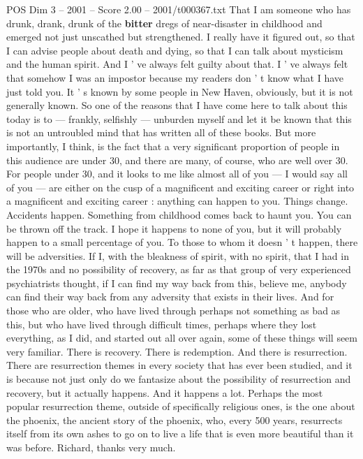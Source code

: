 \begin{textsample}{POS Dim 3 – 2001 – Score 2.00 – 2001/t000367.txt}
That I am someone who has drunk, drank, drunk of the \textbf{bitter} dregs of near-disaster in childhood and emerged not just unscathed but strengthened.
I really have it figured out, so that I can advise people about death and dying, so that I can talk about mysticism and the human spirit.
And I ' ve always felt guilty about that.
I ' ve always felt that somehow I was an impostor because my readers don ' t know what I have just told you.
It ' s known by some people in New Haven, obviously, but it is not generally known.
So one of the reasons that I have come here to talk about this today is to — frankly, selfishly — unburden myself and let it be known that this is not an untroubled mind that has written all of these books.
But more importantly, I think, is the fact that a very significant proportion of people in this audience are under 30, and there are many, of course, who are well over 30.
For people under 30, and it looks to me like almost all of you — I would say all of you — are either on the cusp of a magnificent and exciting career or right into a magnificent and exciting career : anything can happen to you.
Things change.
Accidents happen.
Something from childhood comes back to haunt you.
You can be thrown off the track.
I hope it happens to none of you, but it will probably happen to a small percentage of you.
To those to whom it doesn ' t happen, there will be adversities.
If I, with the bleakness of spirit, with no spirit, that I had in the 1970s and no possibility of recovery, as far as that group of very experienced psychiatrists thought, if I can find my way back from this, believe me, anybody can find their way back from any adversity that exists in their lives.
And for those who are older, who have lived through perhaps not something as bad as this, but who have lived through difficult times, perhaps where they lost everything, as I did, and started out all over again, some of these things will seem very familiar.
There is recovery.
There is redemption.
And there is resurrection.
There are resurrection themes in every society that has ever been studied, and it is because not just only do we fantasize about the possibility of resurrection and recovery, but it actually happens.
And it happens a lot.
Perhaps the most popular resurrection theme, outside of specifically religious ones, is the one about the phoenix, the ancient story of the phoenix, who, every 500 years, resurrects itself from its own ashes to go on to live a life that is even more beautiful than it was before.
Richard, thanks very much.

\end{textsample}
